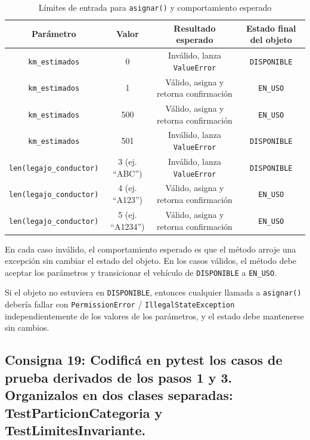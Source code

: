 \begin{table}[ht]
    \centering
    \caption{Límites de entrada para \texttt{asignar()} y comportamiento esperado}
    \label{tab:limites_asignar}
    \begin{tabular}{|c|c|c|c|}
        \hline
        Parámetro & Valor & Resultado esperado & Estado final del objeto \\
        \hline
        \texttt{km\_estimados} & 0 & Inválido, lanza \texttt{ValueError} & \texttt{DISPONIBLE} \\
        \texttt{km\_estimados} & 1 & Válido, asigna y retorna confirmación & \texttt{EN\_USO} \\
        \texttt{km\_estimados} & 500 & Válido, asigna y retorna confirmación & \texttt{EN\_USO} \\
        \texttt{km\_estimados} & 501 & Inválido, lanza \texttt{ValueError} & \texttt{DISPONIBLE} \\
        \hline
        \texttt{len(legajo\_conductor)} & 3 (ej. ``ABC'') & Inválido, lanza \texttt{ValueError} & \texttt{DISPONIBLE} \\
        \texttt{len(legajo\_conductor)} & 4 (ej. ``A123'') & Válido, asigna y retorna confirmación & \texttt{EN\_USO} \\
        \texttt{len(legajo\_conductor)} & 5 (ej. ``A1234'') & Válido, asigna y retorna confirmación & \texttt{EN\_USO} \\
        \hline
    \end{tabular}
\end{table}

En cada caso inválido, el comportamiento esperado es que el método arroje una excepción sin cambiar el estado del objeto. En los casos válidos, el método debe aceptar los parámetros y transicionar el vehículo de \texttt{DISPONIBLE} a \texttt{EN\_USO}.

Si el objeto no estuviera en \texttt{DISPONIBLE}, entonces cualquier llamada a \texttt{asignar()} debería fallar con \texttt{PermissionError} / \texttt{IllegalStateException} independientemente de los valores de los parámetros, y el estado debe mantenerse sin cambios.

\subsection{Consigna 19: Codificá en pytest los casos de prueba derivados de los pasos 1 y 3. Organizalos en dos clases separadas: TestParticionCategoria y TestLimitesInvariante.}

